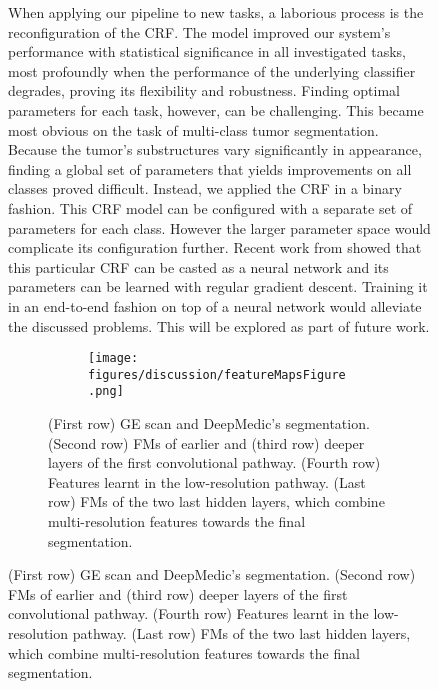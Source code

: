 \documentclass[preprint,authoryear,12pt]{elsarticle}
\begin{document}
\begin{figure}[h]
When applying our pipeline to new tasks, a laborious process is the reconfiguration of the CRF. The model improved our system's performance with statistical significance in all investigated tasks, most profoundly when the performance of the underlying classifier degrades, proving its flexibility and robustness. Finding optimal parameters for each task, however, can be challenging. This became most obvious on the task of multi-class tumor segmentation. Because the tumor's substructures vary significantly in appearance, finding a global set of parameters that yields improvements on all classes proved difficult. Instead, we applied the CRF in a binary fashion. This CRF model can be configured with a separate set of parameters for each class. However the larger parameter space would complicate its configuration further. Recent work from \cite{Zheng2015} showed that this particular CRF can be casted as a neural network and its parameters can be learned with regular gradient descent. Training it in an end-to-end fashion on top of a neural network would alleviate the discussed problems. This will be explored as part of future work.


\begin{figure}[!h]
\vspace{-20pt}
\centering
\begin{subfigure}[b]{0.95\textwidth}
	\centering
	\texttt{[image: figures/discussion/featureMapsFigure.png]}
\end{subfigure}
\vspace{-5pt} \caption{(First row) GE scan and DeepMedic's segmentation. (Second row) FMs of earlier and (third row) deeper layers of the first convolutional pathway. (Fourth row) Features learnt in the low-resolution pathway. (Last row) FMs of the two last hidden layers, which combine multi-resolution features towards the final segmentation.}
\label{fig:featureMaps}
\end{figure}
%
 

\end{figure}
\end{document}
